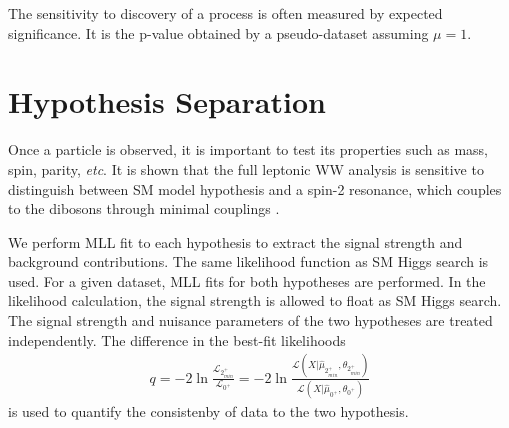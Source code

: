 The sensitivity to discovery of a process is often measured by 
expected significance. It is the p-value obtained by a pseudo-dataset 
assuming $\mu=1$.

\section{Hypothesis Separation} 
Once a particle is observed, it is important to test its properties 
such as mass, spin, parity, \textit{etc}. It is shown that the full leptonic 
WW analysis is sensitive to distinguish between SM model hypothesis and a spin-2 
resonance, which couples to the dibosons through minimal couplings \cite{spin2_ref}. 

We perform MLL fit to each hypothesis to extract the signal strength and 
background contributions. The same likelihood function as SM Higgs search 
is used. For a given dataset, MLL fits for both hypotheses are performed. 
In the likelihood calculation, the signal strength is allowed to float as 
SM Higgs search. The signal strength and nuisance parameters of the two 
hypotheses are treated independently. The difference in the best-fit likelihoods 
\begin{eqnarray}
q
=
-2 \ln \frac{\mathcal{L}_{2^+_{min}}}{\mathcal{L}_{0^+}}
=
-2 \ln \frac{\mathcal{L}\left( X | \hat{\mu}_{2^+_{min}}, \hat{\theta}_{2^+_{min}} \right)}
            {\mathcal{L}\left( X | \hat{\mu}_{0^+}, \hat{\theta}_{0^+} \right)}
\end{eqnarray} 
is used to quantify the consistenby of data to the two hypothesis.   

